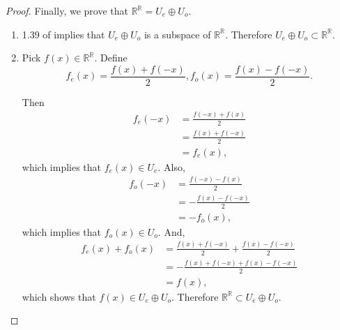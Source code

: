 \begin{proof}
Finally, we prove that $\mathbb{R}^\mathbb{R}=U_e\oplus U_o$.

\begin{enumerate}
\item 1.39 of \cite{axler2014linear} implies that $U_e\oplus U_o$ is a subspace of $\mathbb{R}^\mathbb{R}$. Therefore $U_e\oplus U_o\subset\mathbb{R}^\mathbb{R}$.
\item Pick $f(x)\in \mathbb{R}^\mathbb{R}$. Define
\[
f_e(x)=\frac{f(x)+f(-x)}{2}, f_o(x)=\frac{f(x)-f(-x)}{2}.
\]

Then
\begin{equation*}
\begin{split}
f_e(-x)&=\frac{f(-x)+f(x)}{2}\\
&=\frac{f(x)+f(-x)}{2}\\
&=f_e(x),
\end{split}
\end{equation*}
which implies that $f_e(x)\in U_e$. Also,
\begin{equation*}
\begin{split}
f_o(-x)&=\frac{f(-x)-f(x)}{2}\\
&=-\frac{f(x)-f(-x)}{2}\\
&=-f_o(x),
\end{split}
\end{equation*}
which implies that $f_o(x)\in U_o$. And,
\begin{equation*}
\begin{split}
f_e(x)+f_o(x)&=\frac{f(x)+f(-x)}{2}+\frac{f(x)-f(-x)}{2}\\
&=-\frac{f(x)+f(-x)+f(x)-f(-x)}{2}\\
&=f(x),
\end{split}
\end{equation*}
which shows that $f(x)\in U_e\oplus U_o$. Therefore $\mathbb{R}^\mathbb{R}\subset U_e\oplus U_o$.
\end{enumerate}
\end{proof}

